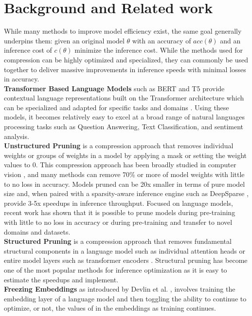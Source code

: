 \section{Background and Related work}
While many methods to improve model efficiency exist, the same goal generally underpins them: given an original model $\theta$ with an accuracy of $acc(\theta)$ and an inference cost of $c(\theta)$ minimize the inference cost. While the methods used for compression can be highly optimized and specialized, they can commonly be used together to deliver massive improvements in inference speeds with minimal losses in accuracy. \\
\textbf{Transformer Based Language Models} such as BERT \cite{Devlin2019BERTPO} and T5 \cite{Raffel2020ExploringTL} provide contextual language representations built on the Transformer architecture \cite{Vaswani2017AttentionIA} which can be specialized and adapted for specific tasks and domains \cite{Lee2020BioBERTAP}. Using these models, it becomes relatively easy to excel at a broad range of natural languages processing tasks such as Question Answering, Text Classification, and sentiment analysis. \\
\textbf{Unstructured Pruning} is a compression approach that removes individual weights or groups of weights in a model by applying a mask or setting the weight values to 0. This compression approach has been broadly studied in computer vision \cite{Han2015ADN}, and many methods can remove 70\% or more of model weights with little to no loss in accuracy. Models pruned can be 20x smaller in terms of pure model size and, when paired with a sparsity-aware inference engine such as DeepSparse \cite{deepsparse}, provide 3-5x speedups in inference throughput. Focused on language models, recent work has shown that it is possible to prune models during pre-training with little to no loss in accuracy \cite{Sanh2020MovementPA} \cite{Kurti2022TheOB} or during pre-training \cite{Zafrir2021PruneOF} and transfer to novel domains \cite{Campos2022SparseBERTSM} and datasets. \\
\textbf{Structured Pruning} is a compression approach that removes fundamental structural components in a language model such as individual attention heads \cite{Voita2019AnalyzingMS} or entire model layers such as transformer encoders \cite{sanh2019distilbert}. Structural pruning has become one of the most popular methods for inference optimization as it is easy to estimate the speedups and implement.\\
\textbf{Freezing Embeddings} as introduced by Devlin et al. \cite{Devlin2019BERTPO}, involves training the embedding layer of a language model and then toggling the ability to continue to optimize, or not, the values of in the embeddings as training continues. \\
